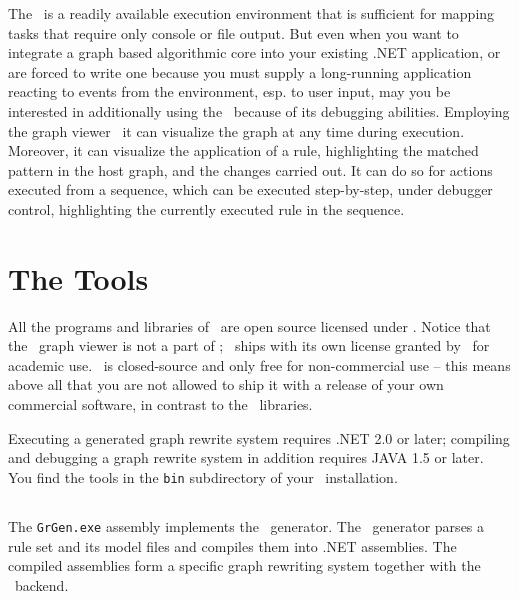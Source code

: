 The \GrShell\ is a readily available execution environment that is sufficient for mapping tasks that require only console or file output.
But even when you want to integrate a graph based algorithmic core into your existing .NET application, 
or are forced to write one because you must supply a long-running application reacting to events from the environment, esp. to user input,
may you be interested in additionally using the \GrShell\ because of its debugging abilities.
Employing the graph viewer \yComp\ it can visualize the graph at any time during execution.
Moreover, it can visualize the application of a rule, highlighting the matched pattern in the host graph, and the changes carried out.
It can do so for actions executed from a sequence, which can be executed step-by-step, under debugger control, highlighting the currently executed rule in the sequence.

\section{The Tools}

All the programs and libraries of \GrG\ are open source licensed under .
Notice that the \yComp\ graph viewer is not a part of \GrG ; \yComp\ ships with its own license granted by \yFiles\ for academic use.
\yComp\ is closed-source and only free for non-commercial use --
this means above all that you are not allowed to ship it with a release of your own commercial software, in contrast to the \GrG\ libraries.

Executing a generated graph rewrite system requires .NET 2.0 or later; compiling and debugging a graph rewrite system in addition requires JAVA 1.5 or later. 
You find the tools in the \texttt{bin} subdirectory of your \GrG\ installation.

\subsection{\texttt{}} \label{grgenoptions}

\noindent The \texttt{GrGen.exe} assembly implements the \GrG\ generator.
The \GrG\ generator parses a rule set and its model files and compiles them into .NET assemblies.
The compiled assemblies form a specific graph rewriting system together with the \GrG\ backend.

